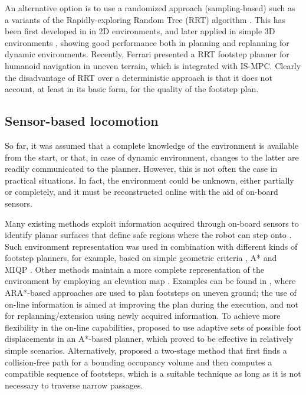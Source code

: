An alternative option is to use a randomized approach (sampling-based) such as
a variants of the Rapidly-exploring Random Tree (RRT) algorithm \cite{LaValle1998RRT}. 
This has been first developed in \cite{Zeyang2009RRTFootstepPlanning,
Zeyang2011RRTFootstepPlanning} in 2D environments, and later applied in simple
3D environments \cite{Perrin2012TRO, Liu2012IROS}, showing
good performance both in planning and replanning for dynamic environments.
Recently, Ferrari \cite{Ferrari2019ECC} presented a RRT footstep planner 
for humanoid navigation in uneven terrain, which is integrated with IS-MPC.
Clearly the disadvantage of RRT over a deterministic approach is that it does
not account, at least in its basic form, for the quality of the footstep plan.

\subsection{Sensor-based locomotion}
So far, it was assumed that a complete knowledge of the environment is available
from the start, or that, in case of dynamic environment, changes to the latter
are readily communicated to the planner. However, this is not often the case in
practical situations. In fact, the environment could be unknown, either
partially or completely, and it must be reconstructed online with the aid of
on-board sensors.

Many existing methods exploit information acquired through on-board sensors to
identify planar surfaces that define safe regions where the robot can step onto
\cite{Gutmann2008EnvironmentMapGeneration, Biswas2012PlanarPolygonExtraction,
Deits2015ComputingLargeConvexRegions, Bertrand2020DetectingUsablePlanarRegions,
Mishra2021GPUAcceleratedRapidPlanarRegionExtraction}.
Such environment representation was used in combination with different kinds of
footstep planners, for example, based on simple geometric criteria
\cite{Okada2005ICRA}, A* \cite{Chestnutt2009IROS, Calvert2022BipedalWalkingoverRapidRegions}
and MIQP \cite{Fallon2015Humanoids}.   
Other methods maintain a more complete representation of the environment by
employing an elevation map \cite{Burgard2016WorldModeling}.
Examples can be found in \cite{Maier2013IROS, Stumpf2014Humanoids},
where ARA*-based approaches are used to plan footsteps on uneven ground; the
use of on-line information is aimed at improving the plan during the execution,
and not for replanning/extension using newly acquired information.
To achieve more flexibility in the on-line capabilities,
\cite{Karkowski2016Humanoids} proposed to use adaptive sets of possible foot
displacements in an A*-based planner, which proved to be effective in relatively
simple scenarios. Alternatively, \cite{Yamamoto2021AdvancedRobotics} proposed a
two-stage method that first finds a collision-free path for a bounding occupancy
volume and then computes a compatible sequence of footsteps, which is a
suitable technique as long as it is not necessary to traverse narrow passages.

